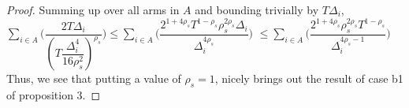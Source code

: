 \begin{proof}
\newline
Summing up over all arms in $A$ and bounding trivially by $T\Delta_{i}$,
\newline\hspace*{4em} $\sum_{i\in A}\bigg(\dfrac{2T\Delta_{i}}{(T\dfrac{\Delta_{i}^{4}}{16\rho_{s}^{2}})^{\rho_{s}}}\bigg)\leq \sum_{i\in A}\bigg(\dfrac{2^{1+4\rho_{s}}T^{1-\rho_{s}}\rho_{s}^{2\rho_{s}}\Delta_{i}}{\Delta_{i}^{4\rho_{s}}}\bigg)$
\newline\hspace*{12em}
$\leq \sum_{i\in A}\bigg(\dfrac{2^{1+4\rho_{s}}\rho_{s}^{2\rho_{s}}T^{1-\rho_{s}}}{\Delta_{i}^{4\rho_{s}-1}}\bigg)$
\newline Thus, we see that putting a value of $\rho_{s}=1$, nicely brings out the result of case b1 of proposition $3$.



\end{proof}
